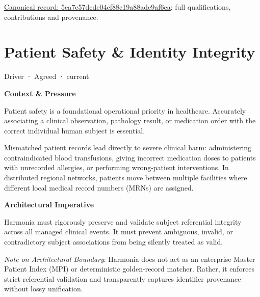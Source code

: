 {\footnotesize \href{../../../../continuum/motivation/driver/5ea7e57dcde04ef88c19a88ade9af6ca.md}{Canonical record: 5ea7e57dcde04ef88c19a88ade9af6ca}; full qualifications, contributions and provenance.}\par
\section{Patient Safety \& Identity Integrity}

\label{element:b835c7b1055e4dbc9e1cd3a0c545c1c8}
{\small Driver · Agreed · current}\par

\par\medskip\textbf{Context \& Pressure}\par


Patient safety is a foundational operational priority in healthcare. Accurately associating a clinical observation, pathology result, or medication order with the correct individual human subject is essential.



Mismatched patient records lead directly to severe clinical harm: administering contraindicated blood transfusions, giving incorrect medication doses to patients with unrecorded allergies, or performing wrong-patient interventions. In distributed regional networks, patients move between multiple facilities where different local medical record numbers (MRNs) are assigned.



\par\medskip\textbf{Architectural Imperative}\par


Harmonia must rigorously preserve and validate subject referential integrity across all managed clinical events. It must prevent ambiguous, invalid, or contradictory subject associations from being silently treated as valid.



\emph{Note on Architectural Boundary}: Harmonia does not act as an enterprise Master Patient Index (MPI) or deterministic golden-record matcher. Rather, it enforces strict referential validation and transparently captures identifier provenance without lossy unification.



